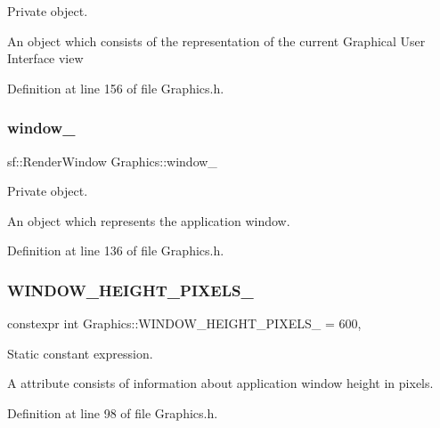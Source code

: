 Private object. 

An object which consists of the representation of the current Graphical User Interface view 

Definition at line 156 of file Graphics.\+h.

\mbox{\label{classGraphics_ac760fe1abb0b648844c9f15afa087ef6}} 
\subsubsection{\texorpdfstring{window\+\_\+}{window\_}}
{\footnotesize\ttfamily sf\+::\+Render\+Window Graphics\+::window\+\_\+\hspace{0.3cm}{\ttfamily [private]}}



Private object. 

An object which represents the application window. 

Definition at line 136 of file Graphics.\+h.

\mbox{\label{classGraphics_a2838b79511d56711b88e677ad48c54e9}} 
\subsubsection{\texorpdfstring{W\+I\+N\+D\+O\+W\+\_\+\+H\+E\+I\+G\+H\+T\+\_\+\+P\+I\+X\+E\+L\+S\+\_\+}{WINDOW\_HEIGHT\_PIXELS\_}}
{\footnotesize\ttfamily constexpr int Graphics\+::\+W\+I\+N\+D\+O\+W\+\_\+\+H\+E\+I\+G\+H\+T\+\_\+\+P\+I\+X\+E\+L\+S\+\_\+ = 600\hspace{0.3cm}{\ttfamily [static]}, {\ttfamily [private]}}



Static constant expression. 

A attribute consists of information about application window height in pixels. 

Definition at line 98 of file Graphics.\+h.

\mbox{\label{classGraphics_a4e8cd4a9f4799e3b7f5e85685d6d4905}} 
